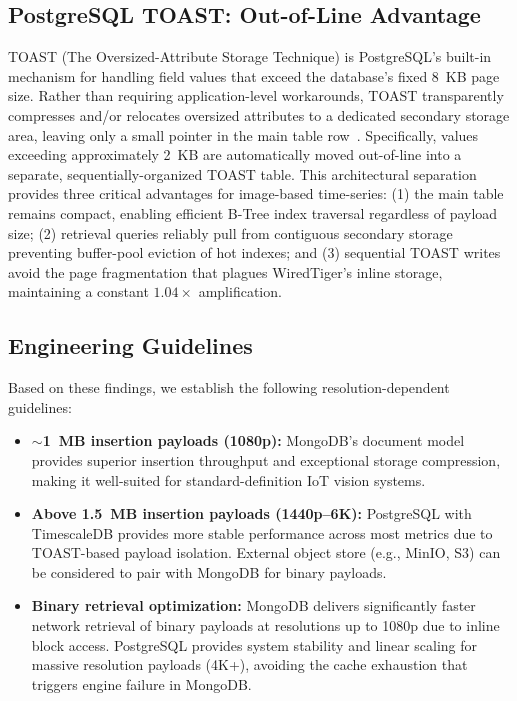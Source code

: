 \documentclass[conference, a4paper]{IEEEtran}
\begin{document}
\subsection{PostgreSQL TOAST: Out-of-Line Advantage}
TOAST (The Oversized-Attribute Storage Technique) is PostgreSQL's built-in mechanism for handling field values that exceed the database's fixed 8~KB page size. Rather than requiring application-level workarounds, TOAST transparently compresses and/or relocates oversized attributes to a dedicated secondary storage area, leaving only a small pointer in the main table row~\cite{postgresql_toast_docs}. Specifically, values exceeding approximately 2~KB are automatically moved out-of-line into a separate, sequentially-organized TOAST table. This architectural separation provides three critical advantages for image-based time-series: (1) the main table remains compact, enabling efficient B-Tree index traversal regardless of payload size; (2) retrieval queries reliably pull from contiguous secondary storage preventing buffer-pool eviction of hot indexes; and (3) sequential TOAST writes avoid the page fragmentation that plagues WiredTiger's inline storage, maintaining a constant $1.04\times$ amplification.

\subsection{Engineering Guidelines}
Based on these findings, we establish the following resolution-dependent guidelines:
\begin{itemize}
    \item \textbf{$\sim$1~MB insertion payloads (1080p):} MongoDB's document model provides superior insertion throughput and exceptional storage compression, making it well-suited for standard-definition IoT vision systems.
    \item \textbf{Above 1.5~MB insertion payloads (1440p--6K):} PostgreSQL with TimescaleDB provides more stable performance across most metrics due to TOAST-based payload isolation. External object store (e.g., MinIO, S3) can be considered to pair with MongoDB for binary payloads.
    \item \textbf{Binary retrieval optimization:} MongoDB delivers significantly faster network retrieval of binary payloads at resolutions up to 1080p due to inline block access. PostgreSQL provides system stability and linear scaling for massive resolution payloads (4K+), avoiding the cache exhaustion that triggers engine failure in MongoDB.
\end{itemize}
\end{document}
